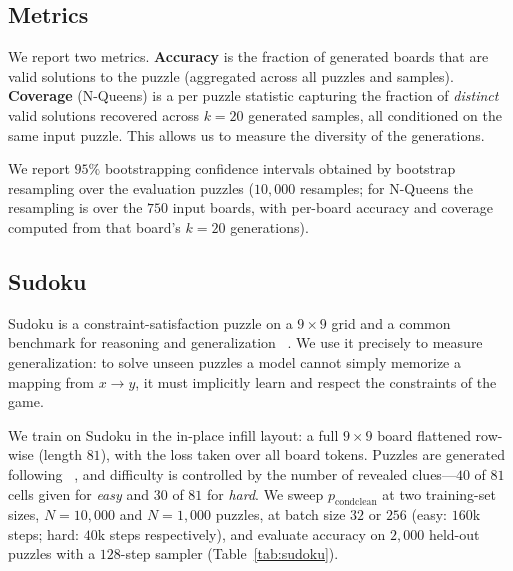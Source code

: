 \documentclass{article}
\begin{document}
\subsection{Metrics}
\label{sec:method-metrics}
We report two metrics. \textbf{Accuracy} is the fraction of generated boards that are valid
solutions to the puzzle (aggregated across all puzzles and samples). \textbf{Coverage} (N-Queens) is
a per puzzle statistic capturing the fraction of \emph{distinct} valid solutions
recovered across $k=20$ generated samples, all conditioned on the same input puzzle. This 
allows us to measure the diversity of the generations.

We report $95\%$ bootstrapping confidence intervals obtained by bootstrap resampling over the
evaluation puzzles ($10{,}000$ resamples; for N-Queens the resampling is over the $750$ input
boards, with per-board accuracy and coverage computed from that board's $k=20$ generations).

\subsection{Sudoku}
\label{sec:sudoku}
Sudoku is a constraint-satisfaction puzzle on a $9\times9$ grid and a common benchmark for
reasoning and generalization ~\citep{trm, gram}. We use it precisely to measure generalization:
to solve unseen puzzles a model cannot simply memorize a mapping from $x \to y$, 
it must implicitly learn and respect the constraints of the game.

We train on Sudoku in the in-place infill layout: a full $9\times9$ board flattened row-wise (length $81$), with the
loss taken over all board tokens. Puzzles are generated following ~\citet{hyperspherical_flows}, and
difficulty is controlled by the number of revealed clues---$40$ of $81$ cells given for
\emph{easy} and $30$ of $81$ for \emph{hard}. We sweep $p_\text{condclean}$ at two training-set
sizes, $N=10{,}000$ and $N=1{,}000$ puzzles, at batch size $32$ or $256$ (easy: $160$k steps; hard: $40$k
steps respectively), and evaluate accuracy on $2{,}000$ held-out puzzles with a $128$-step sampler
(Table~\ref{tab:sudoku}).
\end{document}
